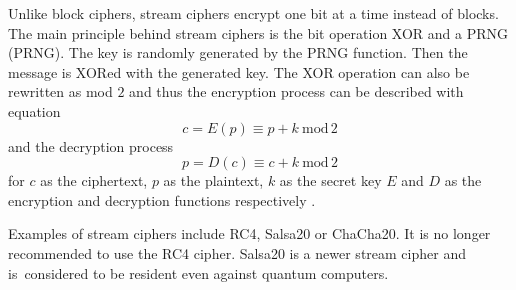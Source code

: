 Unlike block ciphers, stream ciphers encrypt one bit at a time instead of blocks. The main principle behind stream ciphers is the bit operation XOR and a PRNG (\acl{PRNG}). The key is randomly generated by the PRNG function. Then the message is XORed with the generated key. The XOR operation can also be rewritten as mod $2$ and thus the encryption process can be described with equation
\begin{equation}
  c = E(p)\equiv p + k\ \mathrm{mod}\,2
\end{equation}
\noindent and the decryption process
\begin{equation}
  p = D(c)\equiv c + k\ \mathrm{mod}\,2
\end{equation}
\noindent for $c$ as the ciphertext, $p$ as the plaintext, $k$ as the secret key $E$ and $D$ as the encryption and decryption functions respectively \cite{Paar2010}.

Examples of stream ciphers include RC4, Salsa20 or ChaCha20. It is no longer recommended to use the RC4 cipher. Salsa20 is a newer stream cipher and is~considered to be resident even against quantum computers. \cite{Bernstein149}\cite{Ristic2014}
